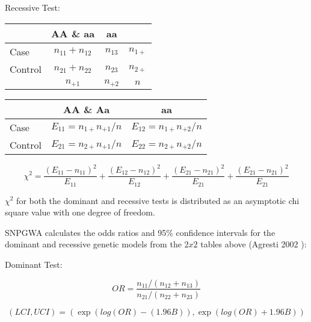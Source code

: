 \begin{enumerate}
\vspace{2em}
Recessive Test:

\vspace{2em}
\begin{center}
  \begin{tabular}{lccc}
    \hline
    {}     & \textbf{AA \& aa} & \textbf{aa} & {} \\
    \hline
    Case    & $n_{11} + n_{12}$   & $n_{13}$ & $n_{1+}$ \\
    Control & $n_{21} + n_{22}$   & $n_{23}$ & $n_{2+}$ \\
    {}     & $n_{+1}$           & $n_{+2}$ & $n$ \\
    \hline  
  \end{tabular}
\end{center}

\begin{center}
  \begin{tabular}{lcc}
    \hline
    {}     & \textbf{AA \& Aa}    & \textbf{aa} \\
    \hline
    Case    & $E_{11}=n_{1+}n_{+1}/n$ & $E_{12}=n_{1+}n_{+2}/n$ \\
    Control & $E_{21}=n_{2+}n_{+1}/n$ & $E_{22}=n_{2+}n_{+2}/n$ \\
    \hline
  \end{tabular}
\end{center}

\begin{equation*}
  \chi^2 = \frac{(E_{11}-n_{11})^2}{E_{11}} + \frac{(E_{12}-n_{12})^2}{E_{12}} +\frac{(E_{21}-n_{21})^2}{E_{21}} + \frac{(E_{21}-n_{21})^2}{E_{21}}
\end{equation*}

$\chi^2$ for both the dominant and recessive tests is distributed
as an asymptotic chi square value with one degree of freedom.

SNPGWA calculates the odds ratios and 95\% confidence intervals for the dominant
and recessive genetic models from the $2 x 2$ tables above (Agresti 2002
\cite{Agresti02}):

Dominant Test:

\begin{equation*}
  OR = \frac{n_{11}/(n_{12}+n_{13})}{n_{21}/(n_{22}+n_{23})}
\end{equation*}

\begin{equation*}
  (LCI,UCI) = (\exp(log(OR) - (1.96B)), \exp(log(OR)+1.96B))
\end{equation*}


\end{enumerate}
